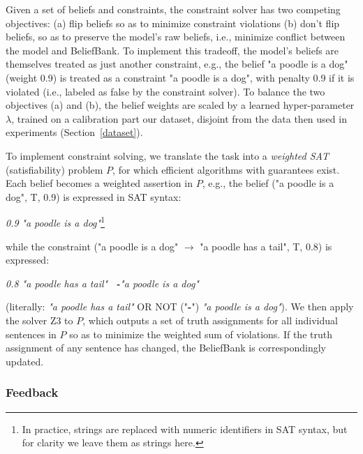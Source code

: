 \documentclass[11pt]{article}
\newcommand{\red}[1]{\textcolor{red}{#1}}
\newenvironment{myquote2}{                   %
  \parskip 1mm \begin{quoting}[vskip=0mm,leftmargin=4mm]}{
\end{quoting}}
\begin{document}
Given a set of beliefs and constraints, the constraint solver has two competing objectives: (a) flip 
beliefs so as to minimize constraint violations (b) don't flip beliefs, so as to preserve
the model's raw beliefs, i.e., minimize conflict between the model and BeliefBank. 
To implement this tradeoff, the model's beliefs are themselves treated as just
another constraint, e.g., the belief "a poodle is a dog" (weight 0.9) is treated as a constraint
"a poodle is a dog", with penalty 0.9 if it is violated (i.e., labeled as false by the constraint solver).
To balance the two objectives (a) and (b), the belief weights are scaled by a learned hyper-parameter $\lambda$,
trained on a calibration part our dataset, disjoint from the data then used in experiments (Section~\ref{dataset}).

To implement constraint solving, we translate the task into a {\it weighted SAT} (satisfiability) problem $P$,
for which efficient algorithms with guarantees exist. Each belief becomes a weighted assertion in $P$, e.g.,
the belief ("a poodle is a dog", T, 0.9) is expressed in SAT syntax:
\begin{myquote2}
{\it 0.9 } %
{\it "a poodle is a dog"}\footnote{In practice, strings are replaced with numeric identifiers in SAT syntax, but for clarity we leave them as strings here.}
\end{myquote2}
while the constraint ("a poodle is a dog" $\rightarrow$ "a poodle has a tail", T, 0.8) is expressed:
\begin{myquote2}
{\it 0.8 "a poodle has a tail"   ~{\bf -}"a poodle is a dog"}
\end{myquote2}
(literally: {\it "a poodle has a tail"} OR NOT ("{\bf -}") {\it "a poodle is a dog"}). 
We then apply the solver Z3 \cite{z3} to $P$, which outputs a set of truth assignments for all individual 
sentences in $P$ so as to minimize the weighted sum of violations. If the truth assignment of any sentence
has changed, the BeliefBank is correspondingly updated. %


\subsubsection{Feedback}
\end{document}
